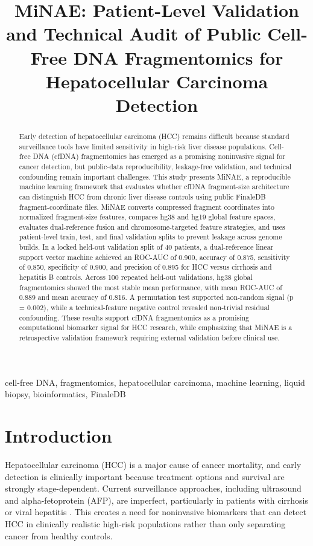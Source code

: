 \documentclass[conference]{IEEEtran}
\title{MiNAE: Patient-Level Validation and Technical Audit of Public Cell-Free DNA Fragmentomics for Hepatocellular Carcinoma Detection}
\author{}
\begin{document}
\maketitle

\begin{abstract}
Early detection of hepatocellular carcinoma (HCC) remains difficult because standard surveillance tools have limited sensitivity in high-risk liver disease populations. Cell-free DNA (cfDNA) fragmentomics has emerged as a promising noninvasive signal for cancer detection, but public-data reproducibility, leakage-free validation, and technical confounding remain important challenges. This study presents MiNAE, a reproducible machine learning framework that evaluates whether cfDNA fragment-size architecture can distinguish HCC from chronic liver disease controls using public FinaleDB fragment-coordinate files. MiNAE converts compressed fragment coordinates into normalized fragment-size features, compares hg38 and hg19 global feature spaces, evaluates dual-reference fusion and chromosome-targeted feature strategies, and uses patient-level train, test, and final validation splits to prevent leakage across genome builds. In a locked held-out validation split of 40 patients, a dual-reference linear support vector machine achieved an ROC-AUC of 0.900, accuracy of 0.875, sensitivity of 0.850, specificity of 0.900, and precision of 0.895 for HCC versus cirrhosis and hepatitis B controls. Across 100 repeated held-out validations, hg38 global fragmentomics showed the most stable mean performance, with mean ROC-AUC of 0.889 and mean accuracy of 0.816. A permutation test supported non-random signal (p = 0.002), while a technical-feature negative control revealed non-trivial residual confounding. These results support cfDNA fragmentomics as a promising computational biomarker signal for HCC research, while emphasizing that MiNAE is a retrospective validation framework requiring external validation before clinical use.
\end{abstract}

\begin{IEEEkeywords}
cell-free DNA, fragmentomics, hepatocellular carcinoma, machine learning, liquid biopsy, bioinformatics, FinaleDB
\end{IEEEkeywords}

\section{Introduction}
Hepatocellular carcinoma (HCC) is a major cause of cancer mortality, and early detection is clinically important because treatment options and survival are strongly stage-dependent. Current surveillance approaches, including ultrasound and alpha-fetoprotein (AFP), are imperfect, particularly in patients with cirrhosis or viral hepatitis \cite{tzartzeva2018surveillance}. This creates a need for noninvasive biomarkers that can detect HCC in clinically realistic high-risk populations rather than only separating cancer from healthy controls.
\end{document}

